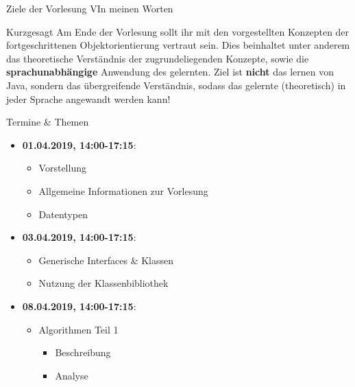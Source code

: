 \begin{frame}{Ziele der Vorlesung V}{In meinen Worten}
	\vfill
	\begin{alertblock}{Kurzgesagt}
		Am Ende der Vorlesung sollt ihr mit den vorgestellten Konzepten der fortgeschrittenen Objektorientierung vertraut sein. Dies beinhaltet unter anderem das theoretische Verständnis der zugrundeliegenden Konzepte,
		sowie die \textbf{sprachunabhängige} Anwendung des gelernten. Ziel ist \textbf{nicht} das lernen von Java, sondern das übergreifende Verständnis, sodass das gelernte (theoretisch) in jeder Sprache angewandt werden kann!
	\end{alertblock}
	\vfill
\end{frame}

\begin{frame}{Termine \& Themen}
	\begin{itemize}
		\item \textbf{01.04.2019, 14:00-17:15}:
		\begin{itemize}
			\item Vorstellung
			\item Allgemeine Informationen zur Vorlesung
			\item Datentypen
		\end{itemize}
		\item \textbf{03.04.2019, 14:00-17:15}:
		\begin{itemize}
			\item Generische Interfaces \& Klassen
			\item Nutzung der Klassenbibliothek
		\end{itemize}
		\item \textbf{08.04.2019, 14:00-17:15}:
		\begin{itemize}
			\item Algorithmen Teil 1
			\begin{itemize}
				\item Beschreibung
				\item Analyse
			\end{itemize}
		\end{itemize}
	\end{itemize}
\end{frame}

